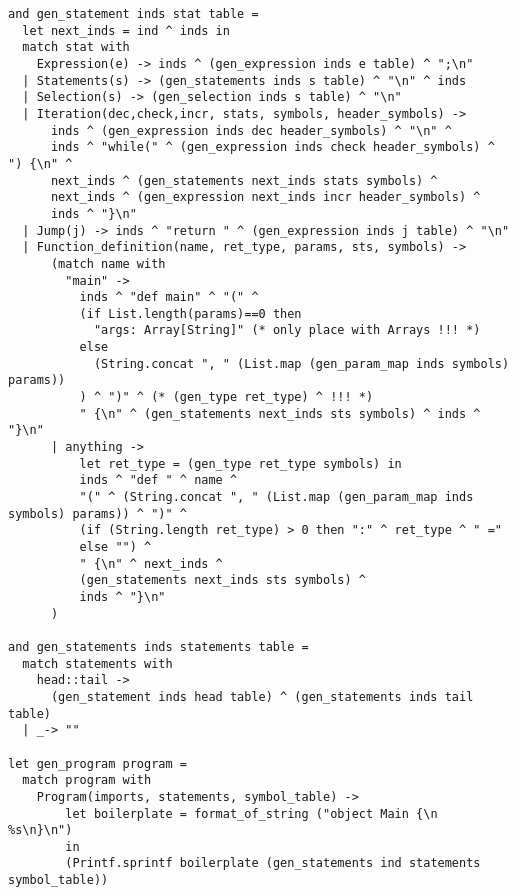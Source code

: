 \begin{verbatim}
and gen_statement inds stat table =
  let next_inds = ind ^ inds in
  match stat with
    Expression(e) -> inds ^ (gen_expression inds e table) ^ ";\n"
  | Statements(s) -> (gen_statements inds s table) ^ "\n" ^ inds
  | Selection(s) -> (gen_selection inds s table) ^ "\n"
  | Iteration(dec,check,incr, stats, symbols, header_symbols) ->
      inds ^ (gen_expression inds dec header_symbols) ^ "\n" ^
      inds ^ "while(" ^ (gen_expression inds check header_symbols) ^ ") {\n" ^
      next_inds ^ (gen_statements next_inds stats symbols) ^
      next_inds ^ (gen_expression next_inds incr header_symbols) ^
      inds ^ "}\n"
  | Jump(j) -> inds ^ "return " ^ (gen_expression inds j table) ^ "\n"
  | Function_definition(name, ret_type, params, sts, symbols) ->
      (match name with
        "main" ->
          inds ^ "def main" ^ "(" ^
          (if List.length(params)==0 then
            "args: Array[String]" (* only place with Arrays !!! *)
          else
            (String.concat ", " (List.map (gen_param_map inds symbols) params))
          ) ^ ")" ^ (* (gen_type ret_type) ^ !!! *)
          " {\n" ^ (gen_statements next_inds sts symbols) ^ inds ^ "}\n"
      | anything ->
          let ret_type = (gen_type ret_type symbols) in
          inds ^ "def " ^ name ^
          "(" ^ (String.concat ", " (List.map (gen_param_map inds symbols) params)) ^ ")" ^
          (if (String.length ret_type) > 0 then ":" ^ ret_type ^ " ="
          else "") ^
          " {\n" ^ next_inds ^
          (gen_statements next_inds sts symbols) ^
          inds ^ "}\n"
      )

and gen_statements inds statements table =
  match statements with
    head::tail ->
      (gen_statement inds head table) ^ (gen_statements inds tail table)
  | _-> ""

let gen_program program =
  match program with
    Program(imports, statements, symbol_table) ->
        let boilerplate = format_of_string ("object Main {\n  %s\n}\n")
        in
        (Printf.sprintf boilerplate (gen_statements ind statements symbol_table))

\end{verbatim}
